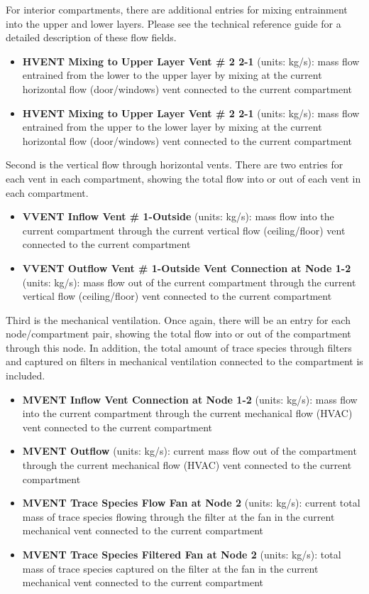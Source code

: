  For interior compartments, there are additional entries for mixing entrainment into the upper and lower layers. Please see the technical reference guide for a detailed description of these flow fields.

\begin{itemize}
\item \textbf{HVENT Mixing to Upper Layer Vent \# 2 2-1} (units: kg/s): mass flow entrained from the lower to the upper layer by mixing at the current horizontal flow (door/windows) vent connected to the current compartment
\item \textbf{HVENT Mixing to Upper Layer Vent \# 2 2-1} (units: kg/s): mass flow entrained from the upper to the lower layer by mixing at the current horizontal flow (door/windows) vent connected to the current compartment
\end{itemize}

Second is the vertical flow through horizontal vents. There are two entries for each vent in each compartment, showing the total flow into or out of each vent in each compartment.

\begin{itemize}
\item \textbf{VVENT Inflow Vent \# 1-Outside} (units: kg/s):  mass flow into the current compartment through the current vertical flow (ceiling/floor) vent connected to the current compartment
\item \textbf{VVENT Outflow Vent \# 1-Outside Vent Connection at Node 1-2} (units: kg/s):  mass flow out of the current  compartment through the current vertical flow (ceiling/floor) vent connected to the current compartment
\end{itemize}

Third is the mechanical ventilation. Once again, there will be an entry for each node/compartment pair, showing the total flow into or out of the compartment through this node. In addition, the total amount of trace species through filters and captured on filters in mechanical ventilation connected to the compartment is included.

\begin{itemize}
\item \textbf{MVENT Inflow Vent Connection at Node 1-2} (units: kg/s): mass flow into the current compartment through the current mechanical flow (HVAC) vent connected to the current compartment
\item \textbf{MVENT Outflow} (units: kg/s): current mass flow out of the compartment through the current mechanical flow (HVAC) vent connected to the current compartment
\item \textbf{MVENT Trace Species Flow Fan at Node 2} (units: kg/s): current total mass of trace species flowing through the filter at the fan in the current mechanical vent connected to the current compartment
\item \textbf{MVENT Trace Species Filtered Fan at Node 2} (units: kg/s): total mass of trace species captured on the filter at the fan in the current mechanical vent connected to the current compartment
\end{itemize}

